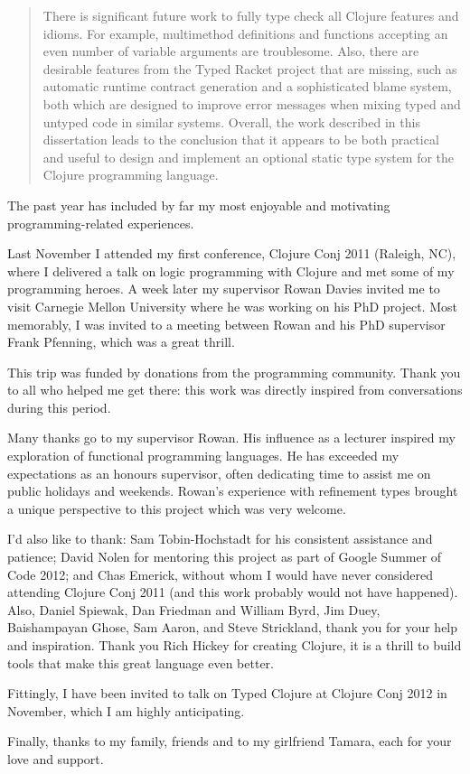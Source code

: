 \documentclass{cshonours}
\begin{document}
\begin{abstract}
There is significant future work to fully type check all Clojure features and idioms.
For example, multimethod definitions and functions accepting an even number of variable arguments
are troublesome. 
Also, there are desirable features from the Typed Racket project that are missing, such
as automatic runtime contract generation and a sophisticated blame system, 
both which are designed to improve error messages when mixing typed and untyped code in similar systems.
Overall, the work described in this dissertation leads to the conclusion that it appears to 
be both practical and useful to design and implement an optional static type system for the
Clojure programming language.

\end{abstract}

\begin{acknowledgements}

The past year has included by far my most enjoyable and motivating programming-related experiences.

Last November I attended my first conference, Clojure Conj 2011 (Raleigh, NC),
where I delivered a talk on logic programming with Clojure and met some of my programming heroes.
A week later my supervisor Rowan Davies invited me to visit Carnegie Mellon University
where he was working on his PhD project. Most memorably, I was invited to a meeting between
Rowan and his PhD supervisor Frank Pfenning, which was a great thrill.

This trip was funded by donations from the programming community. Thank you to all who helped me get there:
this work was directly inspired from conversations during this period.

Many thanks go to my supervisor Rowan. His influence as a lecturer inspired my exploration of
functional programming languages. He has exceeded my expectations as an honours supervisor,
often dedicating time to assist me on public holidays and weekends.
Rowan's experience with refinement types brought a unique perspective to this project
which was very welcome.

I'd also like to thank: Sam Tobin-Hochstadt for his consistent assistance and patience;
David Nolen for mentoring this project as part of Google Summer of Code 2012;
and Chas Emerick, without whom I would have never considered attending Clojure Conj 2011
(and this work probably would not have happened).
Also, Daniel Spiewak, Dan Friedman and William Byrd, Jim Duey, Baishampayan Ghose, Sam Aaron, and
Steve Strickland, thank you for your help and inspiration.
Thank you Rich Hickey for creating Clojure, it is a thrill to build tools that make
this great language even better.

Fittingly, I have been invited to talk on Typed Clojure at Clojure Conj
2012 in November, which I am highly anticipating.

Finally, thanks to my family, friends and to my girlfriend Tamara, each for your love and support.

\end{acknowledgements}
\end{document}
